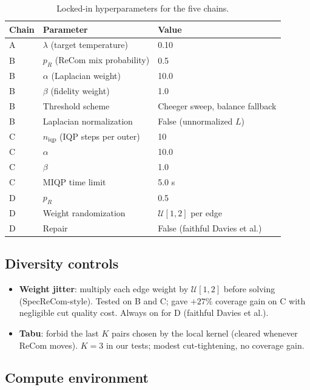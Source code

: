 \documentclass[11pt]{article}
\begin{document}
\begin{table}[H]
\centering
\small
\begin{tabular}{lll}
\toprule
Chain & Parameter & Value \\
\midrule
A & $\lambda$ (target temperature) & 0.10 \\
B & $p_R$ (ReCom mix probability) & 0.5 \\
B & $\alpha$ (Laplacian weight) & 10.0 \\
B & $\beta$ (fidelity weight) & 1.0 \\
B & Threshold scheme & Cheeger sweep, balance fallback \\
B & Laplacian normalization & False (unnormalized $L$) \\
C & $n_{\mathrm{iqp}}$ (IQP steps per outer) & 10 \\
C & $\alpha$ & 10.0 \\
C & $\beta$ & 1.0 \\
C & MIQP time limit & 5.0 s \\
D & $p_R$ & 0.5 \\
D & Weight randomization & $\mathcal{U}[1, 2]$ per edge \\
D & Repair & False (faithful Davies et al.) \\
\bottomrule
\end{tabular}
\caption{Locked-in hyperparameters for the five
  chains.}\label{tab:hyperparams}
\end{table}

\subsection{Diversity controls}\label{app:diversity}

\begin{itemize}
  \item \textbf{Weight jitter}: multiply each edge weight by
    $\mathcal{U}[1, 2]$ before solving (SpecReCom-style). Tested on B
    and C; gave $+27\%$ coverage gain on C with negligible cut quality
    cost. Always on for D (faithful Davies et al.).
  \item \textbf{Tabu}: forbid the last $K$ pairs chosen by the local
    kernel (cleared whenever ReCom moves). $K = 3$ in our tests;
    modest cut-tightening, no coverage gain.
\end{itemize}

\subsection{Compute environment}\label{app:compute}
\end{document}
